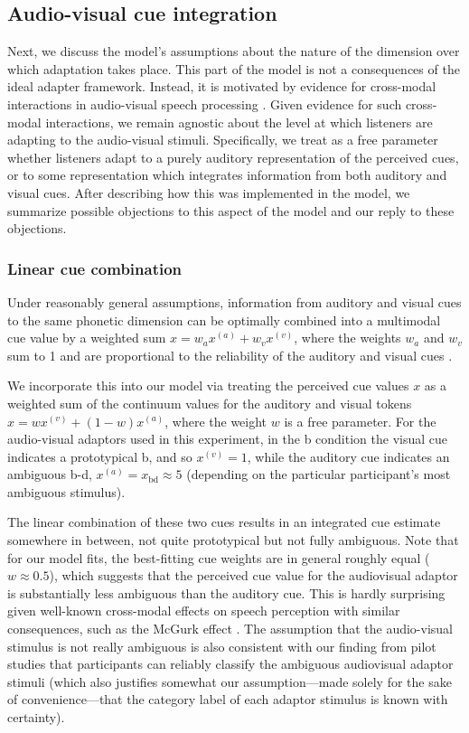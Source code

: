\subsection{Audio-visual cue integration}
\label{sec:audio-visual-cue}

Next, we discuss the model's assumptions about the nature of the dimension over which adaptation takes place. This part of the model is not a consequences of the ideal adapter framework. Instead, it is motivated by evidence for cross-modal interactions in audio-visual speech processing \autocite{Bejjanki2011,McGurk1976}. Given evidence for such cross-modal interactions, we remain agnostic about the level at which listeners are adapting to the audio-visual stimuli. Specifically, we treat as a free parameter whether listeners adapt to a purely auditory representation of the perceived cues, or to some representation which integrates information from both auditory and visual cues. After describing how this was implemented in the model, we summarize possible objections to this aspect of the model and our reply to these objections.

\subsubsection{Linear cue combination}
\label{sec:line-cue-comb}

Under reasonably general assumptions, information from auditory and visual cues to the same phonetic dimension can be optimally combined into a multimodal cue value by a weighted sum $x=w_a x^{(a)} + w_v x^{(v)}$, where the weights $w_a$ and $w_v$ sum to 1 and are proportional to the reliability of the auditory and visual cues \autocite{Bejjanki2011,Ernst2002,Jacobs2002,Knill2003,Toscano2010}.

We incorporate this into our model via treating the perceived cue values $x$ as a weighted sum of the continuum values for the auditory and visual tokens $x=wx^{(v)} + (1-w)x^{(a)}$, where the weight $w$ is a free parameter.  For the audio-visual adaptors used in this experiment, in the \ph b condition the visual cue indicates a prototypical \ph b, and so $x^{(v)} = 1$, while the auditory cue indicates an ambiguous \ph b-\ph d, $x^{(a)} = x_\mathrm{bd} \approx 5$ (depending on the particular participant's most ambiguous stimulus).

The linear combination of these two cues results in an integrated cue estimate somewhere in between, not quite prototypical but not fully ambiguous.  Note that for our model fits, the best-fitting cue weights are in general roughly equal ($w\approx 0.5$), which suggests that the perceived cue value for the audiovisual adaptor is substantially less ambiguous than the auditory cue. This is hardly surprising given well-known cross-modal effects on speech perception with similar consequences, such as the McGurk effect \autocite{McGurk1976}.
The assumption that the audio-visual stimulus is  not really ambiguous is also consistent with our finding from pilot studies that participants can reliably classify the ambiguous audiovisual adaptor stimuli (which also justifies somewhat our assumption---made solely for the sake of convenience---that the category label of each adaptor stimulus is known with certainty).

